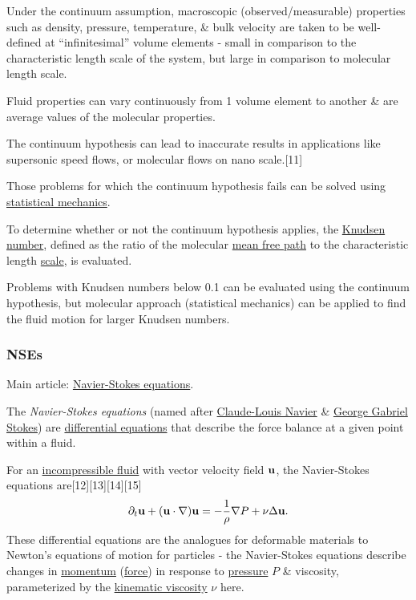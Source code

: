 \documentclass{article}
\begin{document}
Under the continuum assumption, macroscopic (observed/measurable) properties such as density, pressure, temperature, \& bulk velocity are taken to be well-defined at ``infinitesimal'' volume elements - small in comparison to the characteristic length scale of the system, but large in comparison to molecular length scale.

Fluid properties can vary continuously from 1 volume element to another \& are average values of the molecular properties.

The continuum hypothesis can lead to inaccurate results in applications like supersonic speed flows, or molecular flows on nano scale.[11]

Those problems for which the continuum hypothesis fails can be solved using \href{https://en.wikipedia.org/wiki/Statistical_mechanics}{statistical mechanics}.

To determine whether or not the continuum hypothesis applies, the \href{https://en.wikipedia.org/wiki/Knudsen_number}{Knudsen number}, defined as the ratio of the molecular \href{https://en.wikipedia.org/wiki/Mean_free_path}{mean free path} to the characteristic length \href{https://en.wikipedia.org/wiki/Scale_(ratio)}{scale}, is evaluated.

Problems with Knudsen numbers below 0.1 can be evaluated using the continuum hypothesis, but molecular approach (statistical mechanics) can be applied to find the fluid motion for larger Knudsen numbers.

\subsubsection{NSEs}
Main article: \href{https://en.wikipedia.org/wiki/Navier-Stokes_equations}{Navier-Stokes equations}.

%
The \textit{Navier-Stokes equations} (named after \href{https://en.wikipedia.org/wiki/Claude-Louis_Navier}{Claude-Louis Navier} \& \href{https://en.wikipedia.org/wiki/George_Gabriel_Stokes}{George Gabriel Stokes}) are \href{https://en.wikipedia.org/wiki/Differential_equations}{differential equations} that describe the force balance at a given point within a fluid.

For an \href{https://en.wikipedia.org/wiki/Incompressible_fluid}{incompressible fluid} with vector velocity field ${\bf u}$, the Navier-Stokes equations are[12][13][14][15]
\begin{align*}
	\partial_t{\bf u} + ({\bf u}\cdot\nabla){\bf u} = -\frac{1}{\rho}\nabla P + \nu\Delta{\bf u}.
\end{align*}
These differential equations are the analogues for deformable materials to Newton's equations of motion for particles - the Navier-Stokes equations describe changes in \href{https://en.wikipedia.org/wiki/Momentum}{momentum} (\href{https://en.wikipedia.org/wiki/Force}{force}) in response to \href{https://en.wikipedia.org/wiki/Pressure}{pressure} $P$ \& viscosity, parameterized by the \href{https://en.wikipedia.org/wiki/Kinematic_viscosity}{kinematic viscosity} $\nu$ here.
\end{document}
